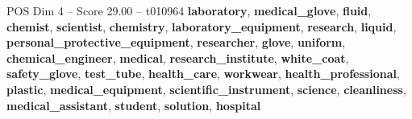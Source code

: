 \begin{textsample}{POS Dim 4 – Score 29.00 – t010964}  \label{ex:f4_pos_014}
\textbf{laboratory}, \textbf{medical\_glove}, \textbf{fluid}, \textbf{chemist}, \textbf{scientist}, \textbf{chemistry}, \textbf{laboratory\_equipment}, \textbf{research}, \textbf{liquid}, \textbf{personal\_protective\_equipment}, \textbf{researcher}, \textbf{glove}, \textbf{uniform}, \textbf{chemical\_engineer}, \textbf{medical}, \textbf{research\_institute}, \textbf{white\_coat}, \textbf{safety\_glove}, \textbf{test\_tube}, \textbf{health\_care}, \textbf{workwear}, \textbf{health\_professional}, \textbf{plastic}, \textbf{medical\_equipment}, \textbf{scientific\_instrument}, \textbf{science}, \textbf{cleanliness}, \textbf{medical\_assistant}, \textbf{student}, \textbf{solution}, \textbf{hospital}

\end{textsample}
